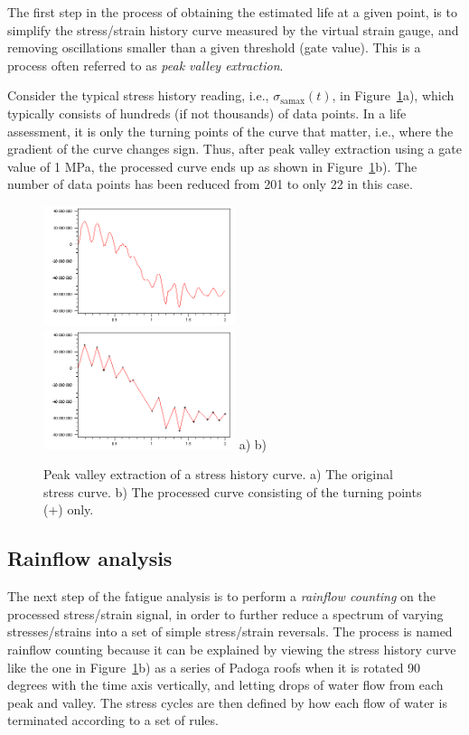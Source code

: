 The first step in the process of obtaining the estimated life at a given point,
is to simplify the stress/strain history curve measured by the virtual strain
gauge, and removing oscillations smaller than a given threshold (gate value).
This is a process often referred to as {\em peak valley extraction\/}.

Consider the typical stress history reading, i.e., $\sigma_\text{samax}(t)$,
in Figure~\ref{fig:PVX}a), which typically consists of hundreds
(if not thousands) of data points.
In a life assessment, it is only the turning points of the curve that matter,
i.e., where the gradient of the curve changes sign.
Thus, after peak valley extraction using a gate value of 1 MPa,
the processed curve ends up as shown in Figure~\ref{fig:PVX}b).
The number of data points has been reduced from 201 to only 22 in this case.

\begin{figure}[b]
\includegraphics[width=0.5\textwidth]{Figures/LoaderRos9_sigma.png}
\includegraphics[width=0.5\textwidth]{Figures/LoaderRos9_pvx.png}
a) \textwidth b)
\caption{Peak valley extraction of a stress history curve.
a) The original stress curve.
b) The processed curve consisting of the turning points (+) only.}
\label{fig:PVX}
\end{figure}

\subsection{Rainflow analysis}

The next step of the fatigue analysis is to perform a {\em rainflow counting\/}
on the processed stress/strain signal, in order to further reduce a spectrum of
varying stresses/strains into a set of simple stress/strain reversals.
The process is named rainflow counting because it can be explained by viewing
the stress history curve like the one in Figure~\ref{fig:PVX}b) as a series of
Padoga roofs when it is rotated 90 degrees with the time axis vertically,
and letting drops of water flow from each peak and valley.
The stress cycles are then defined by how each flow of water is terminated
according to a set of rules.


